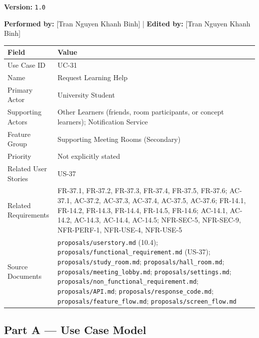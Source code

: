 \documentclass[12pt]{article}
\renewcommand{\baselinestretch}{1.5}
\begin{document}
\textbf{Version:} \texttt{1.0}
\par\medskip

\textbf{Performed by:} [Tran Nguyen Khanh Binh] | \textbf{Edited by:} [Tran Nguyen Khanh Binh]
\par\medskip

\begingroup
\small
\renewcommand{\baselinestretch}{1.0}\selectfont
\renewcommand{\arraystretch}{1.15}
\setlength{\tabcolsep}{6pt}
\begin{longtable}{|>{\raggedright\arraybackslash}p{}|>{\raggedright\arraybackslash}p{}|}
\hline
\textbf{Field} & \textbf{Value} \\ \hline
\endhead
Use Case ID & UC-31 \\ \hline
Name & Request Learning Help \\ \hline
Primary Actor & University Student \\ \hline
Supporting Actors & Other Learners (friends, room participants, or concept learners); Notification Service \\ \hline
Feature Group & Supporting Meeting Rooms (Secondary) \\ \hline
Priority & Not explicitly stated \\ \hline
Related User Stories & US-37 \\ \hline
Related Requirements & FR-37.1, FR-37.2, FR-37.3, FR-37.4, FR-37.5, FR-37.6; AC-37.1, AC-37.2, AC-37.3, AC-37.4, AC-37.5, AC-37.6; FR-14.1, FR-14.2, FR-14.3, FR-14.4, FR-14.5, FR-14.6; AC-14.1, AC-14.2, AC-14.3, AC-14.4, AC-14.5; NFR-SEC-5, NFR-SEC-9, NFR-PERF-1, NFR-USE-4, NFR-USE-5 \\ \hline
Source Documents & \texttt{proposals/userstory.md} (10.4); \texttt{proposals/functional\_requirement.md} (US-37); \texttt{proposals/study\_room.md}; \texttt{proposals/hall\_room.md}; \texttt{proposals/meeting\_lobby.md}; \texttt{proposals/settings.md}; \texttt{proposals/non\_functional\_requirement.md}; \texttt{proposals/API.md}; \texttt{proposals/response\_code.md}; \texttt{proposals/feature\_flow.md}; \texttt{proposals/screen\_flow.md} \\ \hline
\end{longtable}
\endgroup
\par\medskip

\hypertarget{sec:part-a-use-case-model}{}
\subsection*{Part A --- Use Case Model}
\par\medskip
\end{document}
